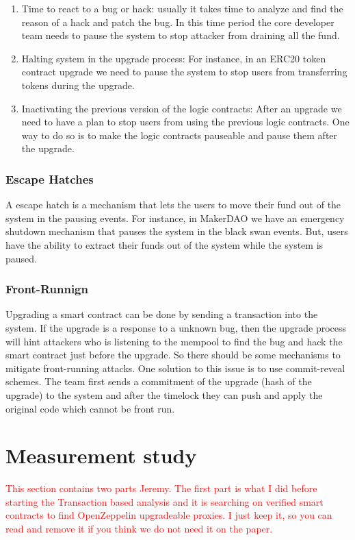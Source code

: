 \begin{enumerate}
  \item Time to react to a bug or hack: usually it takes time to analyze and find the reason of a hack and patch the bug. In this time period the core developer team needs to pause the system to stop attacker from draining all the fund.
  \item Halting system in the upgrade process: For instance, in an ERC20 token contract upgrade we need to pause the system to stop users from transferring tokens during the upgrade. 
  \item Inactivating the previous version of the logic contracts: After an upgrade we need to have a plan to stop users from using the previous logic contracts. One way to do so is to make the logic contracts pauseable and pause them after the upgrade. 
\end{enumerate}

\subsubsection{Escape Hatches}
A escape hatch is a mechanism that lets the users to move their fund out of the system in the pausing events. For instance, in MakerDAO we have an emergency shutdown mechanism that pauses the system in the black swan events. But, users have the ability to extract their funds out of the system while the system is paused.
\subsubsection{Front-Runnign}
Upgrading a smart contract can be done by sending a transaction into the system. If the upgrade is a response to a unknown bug, then the upgrade process will hint attackers who is listening to the mempool to find the bug and hack the smart contract just before the upgrade. So there should be some mechanisms to mitigate front-running attacks. One solution to this issue is to use commit-reveal schemes. The team first sends a commitment of the upgrade (hash of the upgrade) to the system and after the timelock they can push and apply the original code which cannot be front run. 





 \section{Measurement study}
 \textcolor{red}{This section contains two parts Jeremy. The first part is what I did before starting the Transaction based analysis and it is searching on verified smart contracts to find OpenZeppelin upgradeable proxies. I just keep it, so you can read and remove it if you think we do not need it on the paper.}

